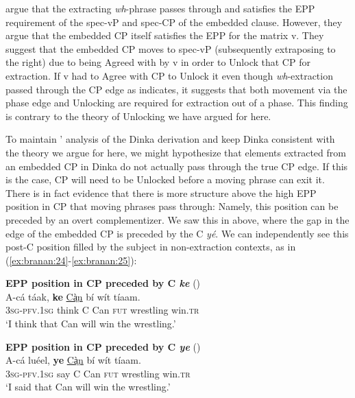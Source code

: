 \documentclass[output=paper,colorlinks,citecolor=brown]{langscibook}
\begin{document}
\citeauthor{VanUrkRichards2015} argue that the extracting \textit{wh}-phrase passes through and satisfies the EPP requirement of the spec-vP and spec-CP of the embedded clause. However, they argue that the embedded CP itself satisfies the EPP for the matrix v. They suggest that the embedded CP moves to spec-vP (subsequently extraposing to the right) due to being Agreed with by v in order to Unlock that CP for extraction. If v had to Agree with CP to Unlock it even though \textit{wh}-extraction passed through the CP edge as  indicates, it suggests that both movement via the phase edge and Unlocking are required for extraction out of a phase. This finding is contrary to the theory of Unlocking we have argued for here.

To maintain \citeauthor{VanUrkRichards2015}' analysis of the Dinka derivation and keep Dinka consistent with the theory we argue for here, we might hypothesize that elements extracted from an embedded CP in Dinka do not actually pass through the true CP edge. If this is the case, CP will need to be Unlocked before a moving phrase can exit it. There is in fact evidence that there is more structure above the high EPP position in CP that moving phrases pass through: Namely, this position can be preceded by an overt complementizer. We saw this in  above, where the gap in the edge of the embedded CP is preceded by the C \textit{y\'{e}}. We can independently see this post-C position filled by the subject in non-extraction contexts, as in (\ref{ex:branan:24}-\ref{ex:branan:25}):

\ea%
    \label{ex:branan:24}
    \textbf{EPP position in CP preceded by C \textit{ke}} 
    \hfill{(\citealt[ex. 4a]{VanUrkRichards2015})}\\
    \gll    A-c\'{a} t\'{a}ak, \textbf{ke}  \underline{Cà̤n} b\'{i}  w\'{i}t t\'{i}aam. \\
            3\textsc{sg-pfv.1sg} think C Can \textsc{fut} wrestling win.\textsc{tr} \\
    \glt    `I think that Can will win the wrestling.'
\z

\ea%
    \label{ex:branan:25}
    \textbf{EPP position in CP preceded by C \textit{ye}} 
    \hfill{(\citealt[ex. 4b]{VanUrkRichards2015})}\\
    \gll    A-c\'{a} lu\'{e}el, \textbf{ye}  \underline{Cà̤n} b\'{i}  w\'{i}t t\'{i}aam. \\
            3\textsc{sg-pfv.1sg} say C Can \textsc{fut} wrestling win.\textsc{tr}  \\
    \glt    `I said that Can will win the wrestling.'
\z
\end{document}
